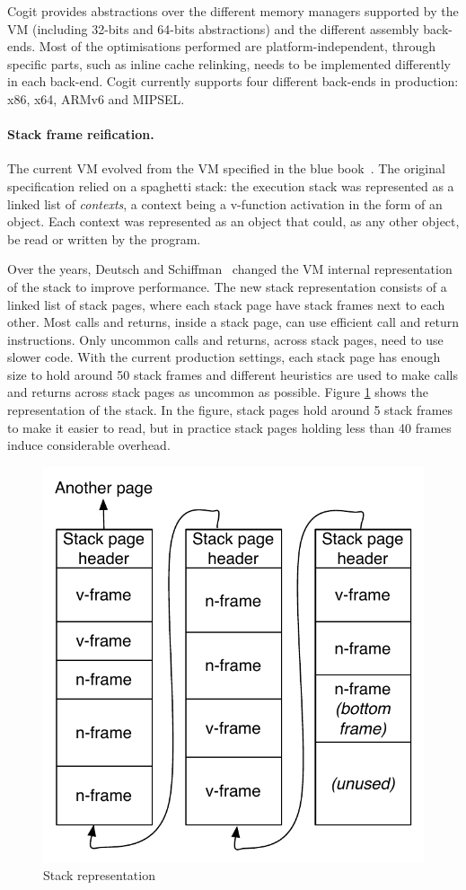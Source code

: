 \documentclass[a4paper,12pt,twoside]{../includes/ThesisStyle}
\begin{document}
Cogit provides abstractions over the different memory managers supported by the VM (including 32-bits and 64-bits abstractions) and the different assembly back-ends. Most of the optimisations performed are platform-independent, through specific parts, such as inline cache relinking, needs to be implemented differently in each back-end. Cogit currently supports four different back-ends in production: x86, x64, ARMv6 and MIPSEL.

\paragraph{Stack frame reification.}
The current VM evolved from the VM specified in the blue book~\cite{Gold83a}. The original specification relied on a spaghetti stack: the execution stack was represented as a linked list of \emph{contexts}, a context being a v-function activation in the form of an object. Each context was represented as an object that could, as any other object, be read or written by the program. 

Over the years, Deutsch and Schiffman~\cite{Deut84a} changed the VM internal representation of the stack to improve performance. The new stack representation consists of a linked list of stack pages, where each stack page have stack frames next to each other. Most calls and returns, inside a stack page, can use efficient call and return instructions. Only uncommon calls and returns, across stack pages, need to use slower code. With the current production settings, each stack page has enough size to hold around 50 stack frames and different heuristics are used to make calls and returns across stack pages as uncommon as possible. Figure \ref{fig:StackRepresentation} shows the representation of the stack. In the figure, stack pages hold around 5 stack frames to make it easier to read, but in practice stack pages holding less than 40 frames induce considerable overhead.

\begin{figure}[h!]
    \begin{center}
        \includegraphics[width=0.52\linewidth]{StackRepresentation}
        \caption{Stack representation}
        \label{fig:StackRepresentation}
    \end{center}
\end{figure}
\end{document}

